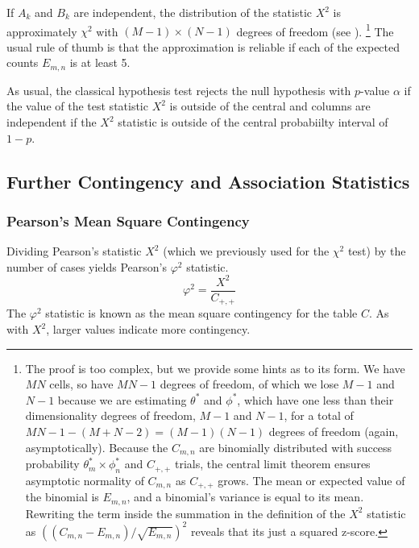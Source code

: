 If $A_k$ and $B_k$ are independent, the distribution of the statistic
$X^2$ is approximately $\chi^2$ with $(M-1) \times (N-1)$ degrees of
freedom (see ).%
%
\footnote{The proof is too complex, but we provide some hints as to
  its form.  We have $MN$ cells, so have $MN-1$ degrees of freedom, of
  which we lose $M-1$ and $N-1$ because we are estimating $\theta^*$
  and $\phi^*$, which have one less than their dimensionality degrees
  of freedom, $M-1$ and $N-1$, for a total of $MN-1 - (M + N -2) =
  (M-1)(N-1)$ degrees of freedom (again, asymptotically).  Because the
  $C_{m,n}$ are binomially distributed with success probability
  $\theta^*_m \times \phi^*_n$ and $C_{+,+}$ trials, the central limit
  theorem ensures asymptotic normality of $C_{m,n}$ as $C_{+,+}$
  grows.  The mean or expected value of the binomial is $E_{m,n}$, and
  a binomial's variance is equal to its mean.  Rewriting the term
  inside the summation in the definition of the $X^2$ statistic as
  $((C_{m,n} - E_{m,n})/\sqrt{E_{m,n}})^2$ reveals that its just a
  squared z-score.}
%
The usual rule of thumb is that the approximation is reliable if each
of the expected counts $E_{m,n}$ is at least 5.

As usual, the classical hypothesis test rejects the null hypothesis with
$p$-value $\alpha$ if the value of the test statistic $X^2$ is outside
of the central and columns are independent if the $X^2$ statistic is
outside of the central probabiilty interval of $1-p$.

\subsection{Further Contingency and Association Statistics}\label{section:classifier-eval-further-assoc}

\subsubsection{Pearson's Mean Square Contingency}

Dividing Pearson's statistic $X^2$ (which we previously used for the
$\chi^2$ test) by the number of cases yields Pearson's $\varphi^2$
statistic.
%
\begin{equation}
\varphi^2 =\frac{X^2}{C_{+,+}}
\end{equation}
%
The $\varphi^2$ statistic is known as the mean square contingency for
the table $C$.  As with $X^2$, larger values indicate more contingency.

